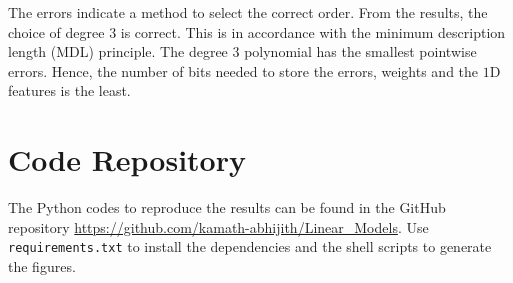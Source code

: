 \documentclass[12pt, a4 paper]{article}
\begin{document}
The errors indicate a method to select the correct order. From the results, the choice of degree $3$ is correct. This is in accordance with the minimum description length (MDL) principle. The degree $3$ polynomial has the smallest pointwise errors. Hence, the number of bits needed to store the errors, weights and the $1$D features is the least.


\section{Code Repository}
The Python codes to reproduce the results can be found in the GitHub repository \url{https://github.com/kamath-abhijith/Linear_Models}. Use \texttt{requirements.txt} to install the dependencies and the shell scripts to generate the figures.
\end{document}
